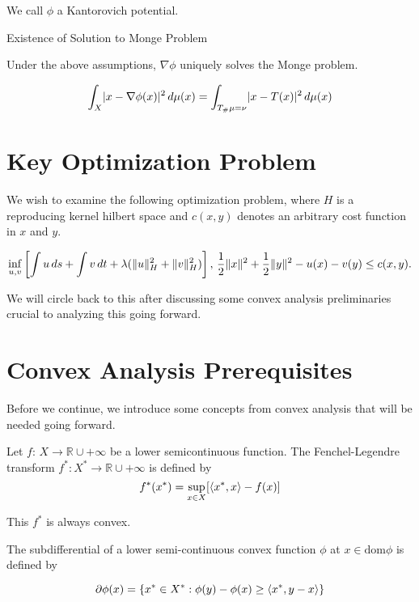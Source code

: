 We call $\phi$ a Kantorovich potential.

\begin{corollary}{Existence of Solution to Monge Problem}
	
Under the above assumptions, $\nabla \phi$ uniquely solves the Monge problem.

\[
\int_X \abs{x-\nabla\phi(x)}^2\,d\mu(x) = \int_{T_{\#}\mu=\nu}\abs{x-T(x)}^2\,d\mu(x)
\]
	
\end{corollary}

\section*{Key Optimization Problem}

We wish to examine the following optimization problem, where $H$ is a reproducing kernel hilbert space and $c(x,y)$ denotes an arbitrary cost function in $x$ and $y$.

$$ \inf_{u,v} \left[ \int u \, ds + \int v \, dt + \lambda (\norm{u}_H^2 + \norm{v}_H^2)\right],\, \frac{1}{2}\norm{x}^2 + \frac{1}{2}\norm{y}^2 - u(x) - v(y)\leq c(x,y). $$

We will circle back to this after discussing some convex analysis preliminaries crucial to analyzing this going forward.

\section{Convex Analysis Prerequisites}

Before we continue, we introduce some concepts from convex analysis that will be needed going forward.

\begin{definition}
	Let $f:\,X\to \mathbb{R}\cup +\infty$ be a lower semicontinuous function. The Fenchel-Legendre transform $f^{*}: X^{*}\to \mathbb{R}\cup +\infty$ is defined by
	$$
	f^{*}(x^{*}) = \sup_{x\in X} [\ang*{x^{*},x}-f(x)]
	$$
	
	This $f^{*}$ is always convex.
\end{definition}

\begin{definition}
	The subdifferential of a lower semi-continuous convex function $\phi$ at $x\in \textrm{dom} \phi$ is defined by
	
	$$
	\partial \phi(x) = \{ x^{*}\in X^{*}: \phi(y)-\phi(x)\geq \ang*{x^{*},y-x} \}
	$$
\end{definition}


